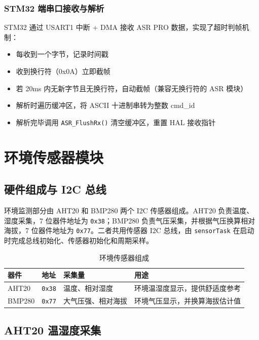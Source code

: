 \documentclass[12pt,a4paper]{ctexart}
\begin{document}
\subsubsection{STM32 端串口接收与解析}

STM32 通过 USART1 中断 + DMA 接收 ASR PRO 数据，实现了超时判帧机制：

\begin{itemize}
    \item 每收到一个字节，记录时间戳
    \item 收到换行符（0x0A）立即截帧
    \item 若 20ms 内无新字节且无换行符，自动截帧（兼容无换行符的 ASR 模块）
    \item 解析时遍历缓冲区，将 ASCII 十进制串转为整数 cmd\_id
    \item 解析完毕调用 \texttt{ASR\_FlushRx()} 清空缓冲区，重置 HAL 接收指针
\end{itemize}

\section{环境传感器模块}

\subsection{硬件组成与 I2C 总线}

环境监测部分由 AHT20 和 BMP280 两个 I2C 传感器组成。AHT20 负责温度、湿度采集，7 位器件地址为 \texttt{0x38}；BMP280 负责气压采集，并根据气压换算相对海拔，7 位器件地址为 \texttt{0x77}。二者共用传感器 I2C 总线，由 \texttt{sensorTask} 在启动时完成总线初始化、传感器初始化和周期采样。

\begin{table}[H]
\centering
\begin{tabularx}{\textwidth}{lllX}
\toprule
\textbf{器件} & \textbf{地址} & \textbf{采集量} & \textbf{用途} \\
\midrule
AHT20 & \texttt{0x38} & 温度、相对湿度 & 环境温湿度显示，提供舒适度参考 \\
BMP280 & \texttt{0x77} & 大气压强、相对海拔 & 环境气压显示，并换算海拔估计值 \\
\bottomrule
\end{tabularx}
\caption{环境传感器组成}
\end{table}

\subsection{AHT20 温湿度采集}
\end{document}
